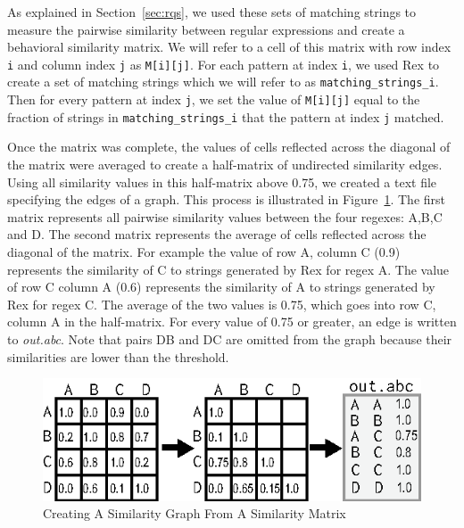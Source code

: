 As explained in Section~\ref{sec:rqs}, we used these sets of matching strings to  measure the pairwise similarity between regular expressions and create a behavioral similarity matrix.  We will refer to a cell of this matrix with row index {\tt i} and column index {\tt j} as {\tt M[i][j]}.  For each pattern at index {\tt i}, we used Rex to create a set of matching strings which we will refer to as {\tt matching\_strings\_i}.  Then for every pattern at index {\tt j}, we set the value of {\tt M[i][j]} equal to the fraction of strings in {\tt matching\_strings\_i} that the pattern at index {\tt j} matched.

Once the matrix was complete, the values of cells reflected across the diagonal of the matrix were averaged to create a half-matrix of undirected similarity edges.  Using all similarity values in this half-matrix above 0.75, we created a text file specifying the edges of a graph.  This process is illustrated in Figure~\ref{fig:matrixToGraph}.
The first matrix represents all pairwise similarity values between the four regexes: A,B,C and D.  The second matrix represents the average of cells reflected across the diagonal of the matrix.  For example the value of row A, column C (0.9) represents the similarity of C to strings generated by Rex for regex A.  The value of row C column A (0.6) represents the similarity of A to strings generated by Rex for regex C.  The average of the two values is 0.75, which goes into row C, column A in the half-matrix.  For every value of 0.75 or greater, an edge is written to \emph{out.abc}.
Note that pairs DB and DC are omitted from the graph because their similarities are lower than the threshold.


\begin{figure}[tb]
\centering
\includegraphics[width=\columnwidth]{../illustrations/matrixToGraph.eps}
\caption{Creating A Similarity Graph From A Similarity Matrix}
\label{fig:matrixToGraph}
\end{figure}
\

